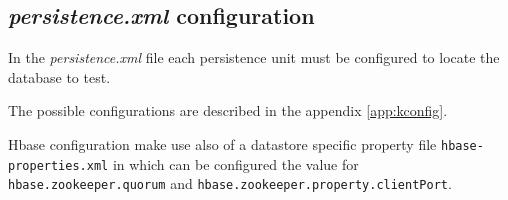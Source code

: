 \subsection{\textit{persistence.xml} configuration}
In the \textit{persistence.xml} file each persistence unit must be configured to locate the database to test.

\noindent The possible configurations are described in the appendix \ref{app:kconfig}.

\noindent Hbase configuration make use also of a datastore specific property file \texttt{hbase-properties.xml} in which can be configured the value for \texttt{hbase.zookeeper.quorum} and \texttt{hbase.zookeeper.property.clientPort}.